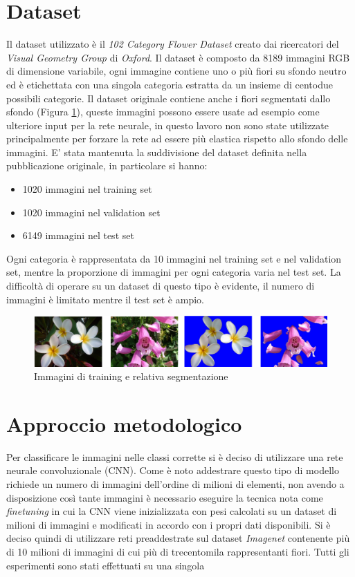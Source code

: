 \section{Dataset}
Il dataset utilizzato è il \textit{102 Category Flower Dataset} \cite{Nilsback08} creato dai ricercatori del \textit{Visual Geometry Group} di \textit{Oxford}. Il dataset è composto da 8189 immagini RGB di dimensione variabile, ogni immagine contiene uno o più fiori su sfondo neutro ed è etichettata con una singola categoria estratta da un insieme di centodue possibili categorie. Il dataset originale contiene anche i fiori segmentati dallo sfondo (Figura \ref{fig_dataset}), queste immagini possono essere usate ad esempio come ulteriore input per la rete neurale, in questo lavoro non sono state utilizzate principalmente per forzare la rete ad essere più elastica rispetto allo sfondo delle immagini.
E' stata mantenuta la suddivisione del dataset definita nella pubblicazione originale, in particolare si hanno:
\begin{itemize}
\item 1020 immagini nel training set
\item 1020 immagini nel validation set
\item 6149 immagini nel test set
\end{itemize}
Ogni categoria è rappresentata da 10 immagini nel training set e nel validation set, mentre la proporzione di immagini per ogni categoria varia nel test set.
La difficoltà di operare su un dataset di questo tipo è evidente, il numero di immagini è limitato mentre il test set è ampio.
\begin{figure}[H]
\centering	
\includegraphics[width=1.0\textwidth]{images/dataset.png} 
\caption{Immagini di training e relativa segmentazione \cite{Nilsback08}}
\label{fig_dataset}
\vspace{-7mm}
\end{figure}


\section{Approccio metodologico}
Per classificare le immagini nelle classi corrette si è deciso di utilizzare una rete neurale convoluzionale (CNN). Come è noto addestrare questo tipo di modello richiede un numero di immagini dell'ordine di milioni di elementi, non avendo a disposizione così tante immagini è necessario eseguire la tecnica nota come \textit{finetuning} in cui la CNN viene inizializzata con pesi calcolati su un dataset di milioni di immagini e modificati in accordo con i propri dati disponibili.
Si è deciso quindi di utilizzare reti preaddestrate sul dataset \textit{Imagenet} contenente più di 10 milioni di immagini di cui più di trecentomila rappresentanti fiori.
Tutti gli esperimenti sono stati effettuati su una singola 
